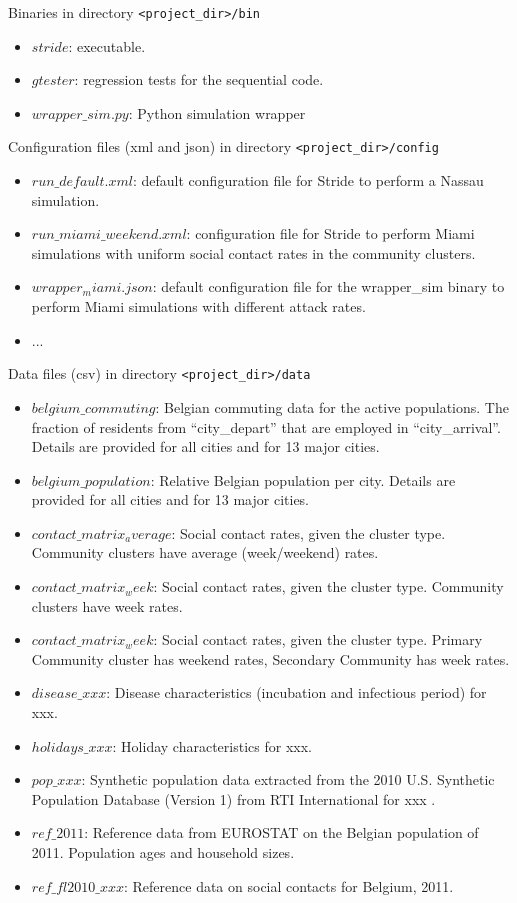 \begin{compactitem}
    \item Binaries 
    		in directory \texttt{<project\_dir>/bin}
      	\begin{itemize}
        		\item $stride$: executable.
		\item $gtester$: regression tests for the sequential code.
        		\item $wrapper\_sim.py$: Python simulation wrapper  		
        \end{itemize}
    \item Configuration files (xml and json)
      	in directory \texttt{<project\_dir>/config}
      	\begin{itemize}
		\item $run\_default.xml$: default configuration file for Stride to perform a Nassau simulation.
        		\item $run\_miami\_weekend.xml$: configuration file for Stride to perform Miami simulations with uniform social contact rates in the community clusters.
		\item $wrapper_miami.json$: default configuration file for the wrapper\_sim binary to perform Miami simulations with different attack rates.
		\item ...
        \end{itemize}
    \item Data files (csv)
      	in directory \texttt{<project\_dir>/data}
      	\begin{itemize}
        		\item $belgium\_commuting$: Belgian commuting data for the active populations. The fraction of residents from ``city\_depart'' that are employed in ``city\_arrival''. Details are provided for all cities and for 13 major cities.
		\item $belgium\_population$: Relative Belgian population per city. Details are provided for all cities and for 13 major cities.
		\item $contact\_matrix_average$: Social contact rates, given the cluster type. Community clusters have average (week/weekend) rates.
		\item $contact\_matrix_week$: Social contact rates, given the cluster type. Community clusters have week rates.
		\item $contact\_matrix_week$: Social contact rates, given the cluster type. Primary Community cluster has weekend rates, Secondary Community has week rates.
		\item $disease\_xxx$: Disease characteristics (incubation and infectious period) for xxx.
		\item $holidays\_xxx$: Holiday characteristics for xxx.
		\item $pop\_xxx$: Synthetic population data extracted from the 2010 U.S. Synthetic Population Database (Version 1) from RTI International for xxx \cite{wheaton2014a,wheaton2014b}.
		\item $ref\_2011$: Reference data from EUROSTAT on the Belgian population of 2011. Population ages and household sizes.
		\item $ref\_fl2010\_xxx$: Reference data on social contacts for Belgium, 2011. 


\end{itemize}
\end{compactitem}
